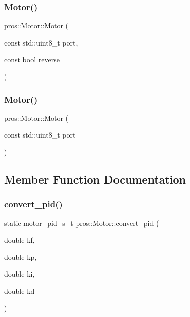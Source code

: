 \mbox{\label{classpros_1_1Motor_a822e0023951996ca7eff13ffe9cf953d}} 
\subsubsection{\texorpdfstring{Motor()}{Motor()}\hspace{0.1cm}{\footnotesize\ttfamily [4/5]}}
{\footnotesize\ttfamily pros\+::\+Motor\+::\+Motor (\begin{DoxyParamCaption}\item[{const std\+::uint8\+\_\+t}]{port,  }\item[{const bool}]{reverse }\end{DoxyParamCaption})\hspace{0.3cm}{\ttfamily [explicit]}}

\mbox{\label{classpros_1_1Motor_a767b4ad39251b8e8411fae17a35b24ba}} 
\subsubsection{\texorpdfstring{Motor()}{Motor()}\hspace{0.1cm}{\footnotesize\ttfamily [5/5]}}
{\footnotesize\ttfamily pros\+::\+Motor\+::\+Motor (\begin{DoxyParamCaption}\item[{const std\+::uint8\+\_\+t}]{port }\end{DoxyParamCaption})\hspace{0.3cm}{\ttfamily [explicit]}}



\subsection{Member Function Documentation}
\mbox{\label{classpros_1_1Motor_adca7af38b0357c254e81ed882a2283a0}} 
\subsubsection{\texorpdfstring{convert\_pid()}{convert\_pid()}}
{\footnotesize\ttfamily static \mbox{\hyperlink{motors_8h_ad2e907c8d7ce53c1fd91f1b9801072e3}{motor\+\_\+pid\+\_\+s\+\_\+t}} pros\+::\+Motor\+::convert\+\_\+pid (\begin{DoxyParamCaption}\item[{double}]{kf,  }\item[{double}]{kp,  }\item[{double}]{ki,  }\item[{double}]{kd }\end{DoxyParamCaption})\hspace{0.3cm}{\ttfamily [static]}}



